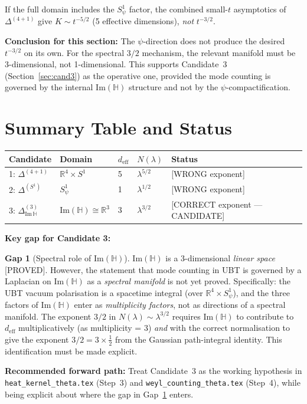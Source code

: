 \documentclass[11pt,a4paper]{article}
\theoremstyle{definition}
\newtheorem{gap}{Gap}
\theoremstyle{remark}
\begin{document}
If the full domain includes the $S^1_\psi$ factor, the combined small-$t$
asymptotics of $\Delta^{(4+1)}$ give $K \sim t^{-5/2}$ (5 effective
dimensions), \emph{not} $t^{-3/2}$.

\textbf{Conclusion for this section:}
The $\psi$-direction does not produce the desired $t^{-3/2}$ on its own.
For the spectral $3/2$ mechanism, the relevant manifold must be 3-dimensional,
not 1-dimensional.
This supports Candidate~3 (Section~\ref{sec:cand3}) as the operative one,
provided the mode counting is governed by the internal $\mathrm{Im}(\mathbb{H})$
structure and not by the $\psi$-compactification.

\section{Summary Table and Status}
\label{sec:summary}

\begin{center}
\begin{tabular}{lllll}
  \toprule
  Candidate & Domain & $d_{\mathrm{eff}}$ & $N(\lambda)$ & Status \\
  \midrule
  1: $\Delta^{(4+1)}$ & $\mathbb{R}^4 \times S^1$ & 5 & $\lambda^{5/2}$ & [WRONG exponent] \\
  2: $\Delta^{(S^1)}$ & $S^1_\psi$ & 1 & $\lambda^{1/2}$ & [WRONG exponent] \\
  3: $\Delta^{(3)}_{\mathrm{Im}\,\mathbb{H}}$ & $\mathrm{Im}(\mathbb{H}) \cong \mathbb{R}^3$ & 3 & $\lambda^{3/2}$ & [CORRECT exponent — CANDIDATE] \\
  \bottomrule
\end{tabular}
\end{center}

\bigskip

\textbf{Key gap for Candidate 3:}

\begin{gap}[Spectral role of $\mathrm{Im}(\mathbb{H})$]
\label{gap:spectral_role}
  $\mathrm{Im}(\mathbb{H})$ is a 3-dimensional \emph{linear space} [PROVED].
  However, the statement that mode counting in UBT is governed by a
  Laplacian on $\mathrm{Im}(\mathbb{H})$ as a \emph{spectral manifold}
  is not yet proved.
  Specifically: the UBT vacuum polarisation is a spacetime integral
  (over $\mathbb{R}^4 \times S^1_\psi$), and the three factors of
  $\mathrm{Im}(\mathbb{H})$ enter as \emph{multiplicity factors},
  not as directions of a spectral manifold.
  The exponent $3/2$ in $N(\lambda) \sim \lambda^{3/2}$ requires
  $\mathrm{Im}(\mathbb{H})$ to contribute to $d_{\mathrm{eff}}$
  multiplicatively (as multiplicity = 3) \emph{and} with the correct
  normalisation to give the exponent $3/2 = 3 \times \frac{1}{2}$
  from the Gaussian path-integral identity.
  This identification must be made explicit.
\end{gap}

\bigskip

\textbf{Recommended forward path:}
Treat Candidate~3 as the working hypothesis in
\texttt{heat\_kernel\_theta.tex} (Step~3) and
\texttt{weyl\_counting\_theta.tex} (Step~4),
while being explicit about where the gap in Gap~\ref{gap:spectral_role}
enters.

\ifdefined\INCLUDEMODE\else
\end{document}
